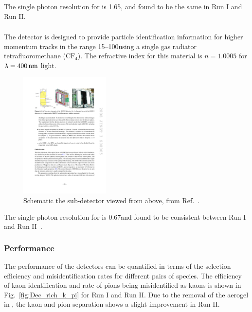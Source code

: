 The single photon resolution for \richone is 1.65\mrad, and found to be the same in Run I and Run II.  


\subsubsection{\richtwo}

The \richtwo detector is designed to provide particle identification information for higher momentum tracks in the range 15--100\gevc using a single gas radiator tetrafluoromethane ($\text{C}\text{F}_{4}$). The refractive index for this material is $n=1.0005$ for $\lambda = 400\mathrm{ \,nm}$ light.

\begin{figure}[!h]
    \centering        
    \includegraphics[width=0.4\textwidth]{figs/Detector/richtwo_layout.pdf}
    \caption{Schematic the \richtwo sub-detector viewed from above, from Ref.~\cite{Alves:2008zz}.}
    \label{fig:Dec_richtwo_layout}   
\end{figure}
The single photon resolution for \richtwo is 0.67\mrad and found to be consistent between Run I and Run II~\cite{PAPANESTIS2017221}.


\subsubsection{Performance}
The performance of the \rich detectors can be quantified in terms of the selection efficiency and misidentification rates for different pairs of species. The efficiency of kaon identification and rate of pions being misidentified as kaons is shown in Fig.~\ref{fig:Dec_rich_k_pi} for Run I and Run II. Due to the removal of the aerogel in \richone, the kaon and pion separation shows a slight improvement in Run II.

